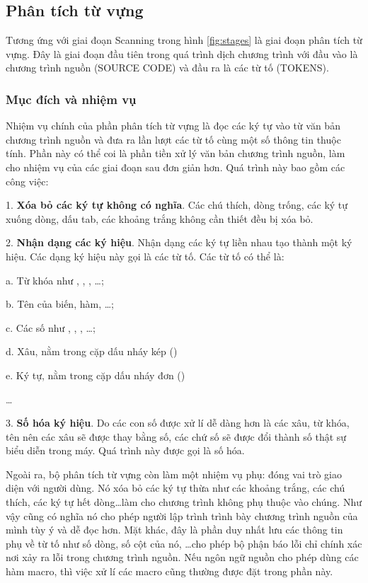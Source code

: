 \subsection{Phân tích từ vựng}

    Tương ứng với giai đoạn Scanning trong hình \ref{fig:stages} là giai đoạn phân tích từ vựng. Đây là giai đoạn đầu tiên trong quá trình dịch chương trình với đầu vào là chương trình nguồn (SOURCE CODE) và đầu ra là các từ tố (TOKENS).

\subsubsection{Mục đích và nhiệm vụ}
    Nhiệm vụ chính của phần phân tích từ vựng là đọc các ký tự vào từ văn bản chương trình nguồn và đưa ra lần lượt các từ tố cùng một số thông tin thuộc tính. Phần này có thể coi là phần tiền xử lý văn bản chương trình nguồn, làm cho nhiệm vụ của các giai đoạn sau đơn giản hơn. Quá trình này bao gồm các công việc:

1. \textbf{Xóa bỏ các ký tự không có nghĩa}. Các chú thích, dòng trống, các ký tự xuống dòng, dấu tab, các khoảng trắng không cần thiết đều bị xóa bỏ.

2. \textbf{Nhận dạng các ký hiệu}. Nhận dạng các ký tự liền nhau tạo thành một ký hiệu. Các dạng ký hiệu này gọi là các từ tố. Các từ tố có thể là:

a. Từ khóa như , , , \dots;

b. Tên của biến, hàm, \dots;

c. Các số như , , , \dots;

d. Xâu, nằm trong cặp dấu nháy kép ()

e. Ký tự, nằm trong cặp dấu nháy đơn ()

\dots

3. \textbf{Số hóa ký hiệu}. Do các con số được xử lí dễ dàng hơn là các xâu, từ khóa, tên nên các xâu sẽ được thay bằng số, các chứ số sẽ được đổi thành số thật sự biểu diễn trong máy. Quá trình này được gọi là số hóa.

    Ngoài ra, bộ phân tích từ vựng còn làm một nhiệm vụ phụ: đóng vai trò giao diện với người dùng. Nó xóa bỏ các ký tự thừa như các khoảng trắng, các chú thích, các ký tự hết dòng\dots\space làm cho chương trình không phụ thuộc vào chúng. Như vậy cũng có nghĩa nó cho phép người lập trình trình bày chương trình nguồn của mình tùy ý và dễ đọc hơn. Mặt khác, đây là phần duy nhất lưu các thông tin phụ về từ tố như số dòng, số cột của nó, \dots\space cho phép bộ phận báo lỗi chỉ chính xác nơi xảy ra lỗi trong chương trình nguồn. Nếu ngôn ngữ nguồn cho phép dùng các hàm macro, thì việc xử lí các macro cũng thường được đặt trong phần này.

